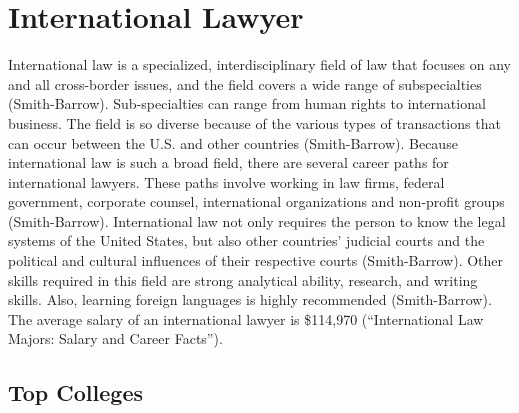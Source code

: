 \chapter{International Lawyer}
\begin{multicols}{2}

International law is a specialized, interdisciplinary field of law that focuses on any and all cross-border issues, and the field covers a wide range of subspecialties (Smith-Barrow). Sub-specialties can range from human rights to international business. The field is so diverse because of the various types of transactions that can occur between the U.S. and other countries (Smith-Barrow). Because international law is such a broad field, there are several career paths for international lawyers. These paths involve working in law firms, federal government, corporate counsel, international organizations and non-profit groups (Smith-Barrow). International law not only requires the person to know the legal systems of the United States, but also other countries’ judicial courts and the political and cultural influences of their respective courts (Smith-Barrow). Other skills required in this field are strong analytical ability, research, and writing skills. Also, learning foreign languages is highly recommended (Smith-Barrow). The average salary of an international lawyer is \$114,970 (“International Law Majors: Salary and Career Facts”).

\end{multicols}

\section{Top Colleges}

\begin{table}[H]
\centering
\caption{Undergraduate Colleges}
\label{International Lawyer Undergraduate Colleges}
\end{table}


